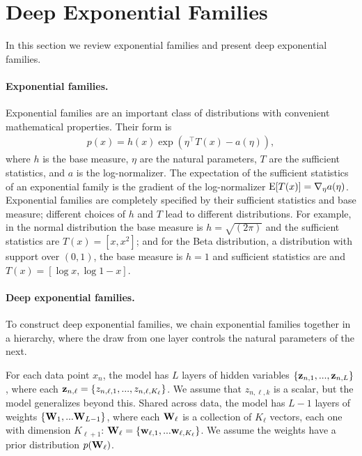 \documentclass[twoside]{article}
\begin{document}
\section{Deep Exponential Families}

In this section we review exponential families and present deep 
exponential families.

\paragraph{Exponential families.}
Exponential families \citep{Brown:1986} are an important
class of distributions with
convenient mathematical properties. Their form is
\begin{align*}
p(x) = h(x) \exp (\eta^\top T(x) - a(\eta)),
\end{align*}
where $h$ is the base measure, $\eta$ are the natural
parameters, $T$ are the sufficient statistics, and $a$
is the log-normalizer. The expectation of the sufficient
statistics of an exponential family is the
gradient of the log-normalizer $\textrm{E}[T(x)] = \nabla_\eta a(\eta)$. Exponential families 
are completely specified by their sufficient statistics
and base measure; different choices of $h$ and $T$
lead to different distributions. For example, in the normal 
distribution the base measure is $h=\sqrt{(2\pi)}$  and the sufficient 
statistics are $T(x)=[x, x^2]$; and for the Beta distribution, a distribution 
with support over $(0,1)$,  the base measure is $h = 1$ and sufficient 
statistics are and $T(x) = [\log x, \log 1 - x]$.

\paragraph{Deep exponential families.}
To construct deep exponential families, 
we chain exponential families together in a hierarchy,
where the draw from one layer controls the natural parameters
of the next. 

For each data point $x_n$, the model has $L$ layers of hidden
variables $\{ \boldsymbol{\mathbf{z}}_{n, 1}, ...,   \boldsymbol{\mathbf{z}}_{n, L} \}$, 
where each $\boldsymbol{\mathbf{z}}_{n,\ell} = \{z_{n, \ell, 1}, ..., z_{n, \ell, K_\ell} \}$. 
We assume that
$z_{n, \ell, k}$ is a scalar, but the model generalizes beyond this.
Shared across data, the model has $L-1$ layers of weights $\{\boldsymbol{\mathbf{W}}_1, ... \boldsymbol{\mathbf{W}}_{L-1} \}$,
where each $\boldsymbol{\mathbf{W}}_{\ell}$ is a collection of $K_{\ell}$ vectors, each one
with dimension $K_{\ell+1}$: $\boldsymbol{\mathbf{W}}_{\ell} = \{\boldsymbol{\mathbf{w}}_{\ell, 1}, ... \boldsymbol{\mathbf{w}}_{\ell, K_\ell} \}$.
We assume the weights have a prior 
distribution $p(\boldsymbol{\mathbf{W}}_{\ell})$.
\end{document}
